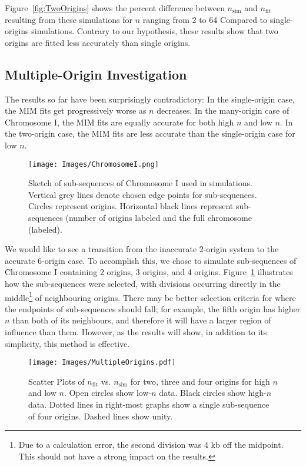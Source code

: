 		Figure~\ref{fig:TwoOrigins} shows the percent difference between $n_\text{sim}$ and $n_\text{fit}$ resulting from these simulations for $n$ ranging from 2 to 64 Compared to single-origins simulations.
		Contrary to our hypothesis, these results show that two origins are fitted less accurately than single origins.
		
		
		\subsection{Multiple-Origin Investigation}
		
		The results so far have been surprisingly contradictory:
		In the single-origin case, the MIM fits get progressively worse as $n$ decreases.
		In the many-origin case of Chromosome I, the MIM fits are equally accurate for both high $n$ and low $n$.
		In the two-origin case, the MIM fits are less accurate than the single-origin case for low $n$.
		
	\begin{figure}[tbh]
		\begin{center}
			\texttt{[image: Images/ChromosomeI.png]}
		\end{center}
			\caption[Sketch of Sub-sequences of Chromosome I]{\label{fig:ChrISubSeq} 
				Sketch of sub-sequences of Chromosome I used in simulations.
				Vertical grey lines denote chosen edge points for sub-sequences.
				Circles represent origins.
				Horizontal black lines represent sub-sequences (number of origins labeled and the full chromosome (labeled).
			}
	\end{figure} 

		We would like to see a transition from the inaccurate 2-origin system to the accurate 6-origin case.
		To accomplish this, we chose to simulate sub-sequences of Chromosome I containing 2 origins, 3 origins, and 4 origins.
		Figure~\ref{fig:ChrISubSeq} illustrates how the sub-sequences were selected, with divisions occurring directly in the middle\footnote{
		Due to a calculation error, the second division was 4 kb off the midpoint. This should not have a strong impact on the results.}
		of neighbouring origins.
		There may be better selection criteria for where the endpoints of sub-sequences should fall;
		for example, the fifth origin has higher $n$ than both of its neighbours, and therefore it will have a larger region of influence than them.
		However, as the results will show, in addition to its simplicity, this method is effective.
		
	\begin{figure}[tbh]
		\begin{center}
			\texttt{[image: Images/MultipleOrigins.pdf]}
		\end{center}
			\caption[Scatter Plots of $n_\text{fit}$ vs. $n_\text{sim}$ for Two, Three and Four Origins]{\label{fig:IncreasingOrigins} 
				Scatter Plots of $n_\text{fit}$ vs. $n_\text{sim}$ for two, three and four origins for high $n$ and low $n$.
				Open circles show low-$n$ data.
				Black circles show high-$n$ data.
				Dotted lines in right-most graphs show a single sub-sequence of four origins.
				Dashed lines show unity.
			}
	\end{figure} 
		
